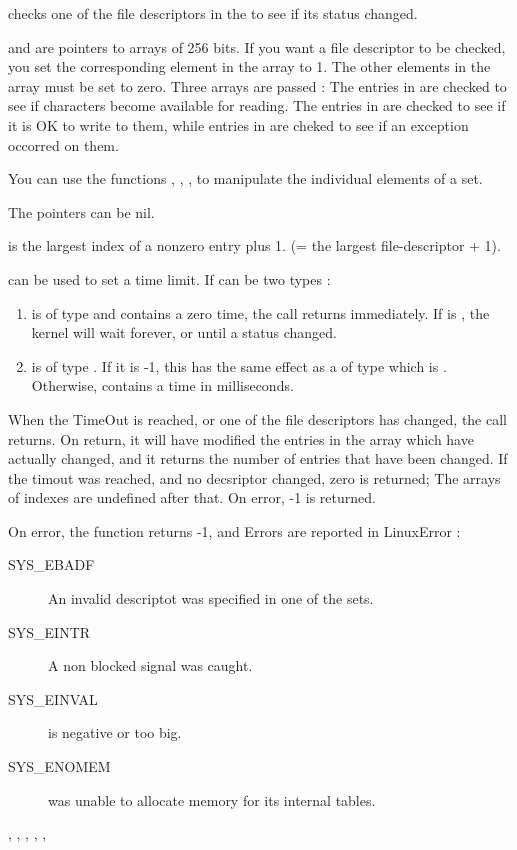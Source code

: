{ checks one of the file descriptors in the  to see if its
status changed.

 and  are pointers to arrays of 256
bits. If you want a file descriptor to be checked, you set the
corresponding element in the array to 1. The other elements in the array
must be set to zero. Three arrays are passed : The entries in 
are checked to see if characters become available for reading. The entries
in  are checked to see if it is OK to write to them, while
entries in  are cheked to see if an exception occorred on
them.

You can use the functions , , 
,  to manipulate the individual elements of a set.

The pointers can be nil.

 is the largest index of a nonzero entry plus 1. (= the largest
file-descriptor + 1).

 can be used to set a time limit. 
If  can be two types :
\begin{enumerate}
\item {} is of type  and contains a
zero time, the call returns immediately. If  is , the
kernel will wait forever, or until a status changed.    
\item {} is of type . If it is -1, this has the same
effect as a  of type   which is .
Otherwise,  contains a time in milliseconds.
\end{enumerate}
 
When the TimeOut is reached, or one of the file descriptors has changed,
the  call returns. On return, it will have modified the entries
in the array which have actually changed, and it returns the number of
entries that have been changed. If the timout was reached, and no decsriptor
changed, zero is returned; The arrays of indexes are undefined after that.
On error, -1 is returned.}
{On error, the function returns -1, and Errors are reported in LinuxError :
\begin{description}
\item[SYS\_EBADF\ ] An invalid descriptot was specified in one of the sets.
\item[SYS\_EINTR\ ] A non blocked signal was caught.
\item[SYS\_EINVAL\ ]   is negative or too big.
\item[SYS\_ENOMEM\ ]  was unable to allocate memory for its 
 internal tables.
\end{description}}
{, , 
,
,
, 
}

